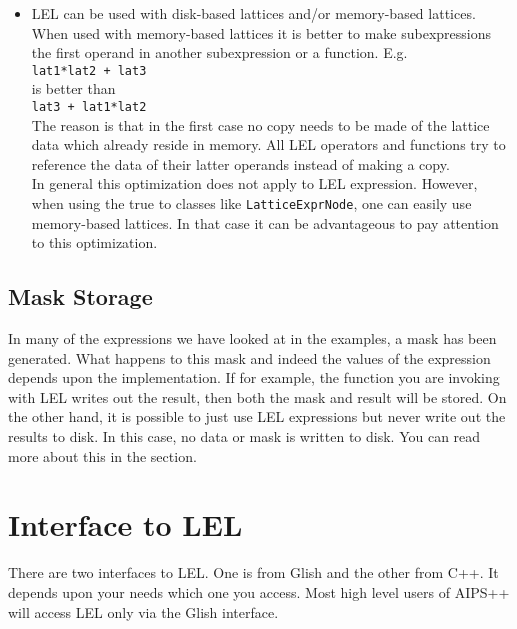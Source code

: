 \begin{itemize}
\item
LEL can be used with disk-based lattices and/or memory-based lattices.
When used with memory-based lattices it is better to make
subexpressions the first operand in another subexpression or a
function. E.g.
\\\texttt{lat1*lat2 + lat3}
\\is better than
\\\texttt{lat3 + lat1*lat2}
\\The reason is that in the first case no copy needs to be made of the
lattice data which already reside in memory. All LEL operators and
functions try to reference the data of their latter operands instead
of making a copy.
\\In general this optimization does not apply to LEL expression.
However, when using the true 
to classes like \texttt{LatticeExprNode}, one can easily use
memory-based lattices. In that case it can be advantageous to pay
attention to this optimization.

\end{itemize}

\subsection{Mask Storage}

In many of the expressions we have looked at in the examples, a mask has
been generated.  What happens to this mask and indeed the values of the
expression depends upon the implementation.  If for example, the
function you are invoking with LEL writes out the result, then both the
mask and result will be stored.  On the other hand, it is possible to
just use LEL expressions but never write out the results to disk.  In
this case, no data or mask is written to disk.   You can read
more about this in the  section.


\section{\label{LEL:GLISHC}Interface to LEL}

There are two interfaces to LEL.  One is from Glish and the
other from C++.   It depends upon your needs which one
you access.  Most high level users of AIPS++ will access
LEL only via the Glish interface.

